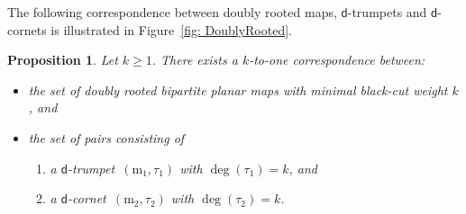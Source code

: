 \documentclass[11pt,reqno,tbtags]{amsart}
\renewcommand{\rm}{\mathrm{m}}
\newtheorem{prop}[theo]{Proposition}
\numberwithin{equation}{section}
\numberwithin{theo}{section}
\theoremstyle{definition}
\newcommand{\dtrum}{$\mathsf{d}$-trumpet}
\newcommand{\dcorn}{$\mathsf{d}$-cornet}
\begin{document}
The following correspondence between doubly rooted maps, \dtrum s and \dcorn s is illustrated in Figure~\ref{fig: DoublyRooted}.
\begin{prop} \label{prop:ktoone}
Let $k\geq 1$. There exists a $k$-to-one correspondence between:
\begin{itemize}
	\item the set of doubly rooted bipartite planar maps with minimal black-cut weight $k$, and
	\item the set of pairs consisting of
	\begin{enumerate}
		\item[1)] a \dtrum~$(\rm_1,\tau_1)$ with $\deg(\tau_1)=k$, and
		\item[2)] a \dcorn~$(\rm_2,\tau_2)$ with $\deg(\tau_2)=k$.
\end{enumerate}	 
\end{itemize}
\end{prop} 
\end{document}
